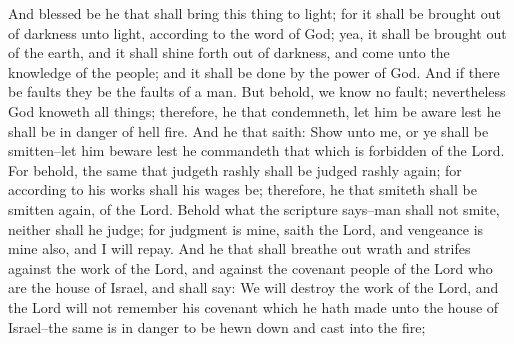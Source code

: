 And blessed be he that shall bring this thing to light; for it shall be brought out of darkness unto light, according to the word of God; yea, it shall be brought out of the earth, and it shall shine forth out of darkness, and come unto the knowledge of the people; and it shall be done by the power of God.
\bverse \iffalse And if there be faults they be the faults of a man. But behold, we know no fault; nevertheless God knoweth all things; therefore, he that condemneth, let him be aware lest he shall be in danger of hell fire. \fi
And if there be faults they be the faults of a man. But behold, we know no fault; nevertheless God knoweth all things; therefore, he that condemneth, let him be aware lest he shall be in danger of hell fire.
\bverse \iffalse And he that saith: Show unto me, or ye shall be smitten--let him beware lest he commandeth that which is forbidden of the Lord. \fi
And he that saith: Show unto me, or ye shall be smitten--let him beware lest he commandeth that which is forbidden of the Lord.
\bverse \iffalse For behold, the same that judgeth rashly shall be judged rashly again; for according to his works shall his wages be; therefore, he that smiteth shall be smitten again, of the Lord. \fi
For behold, the same that judgeth rashly shall be judged rashly again; for according to his works shall his wages be; therefore, he that smiteth shall be smitten again, of the Lord.
\bverse \iffalse Behold what the scripture says--man shall not smite, neither shall he judge; for judgment is mine, saith the Lord, and vengeance is mine also, and I will repay. \fi
Behold what the scripture says--man shall not smite, neither shall he judge; for judgment is mine, saith the Lord, and vengeance is mine also, and I will repay.
\bverse \iffalse And he that shall breathe out wrath and strifes against the work of the Lord, and against the covenant people of the Lord who are the house of Israel, and shall say: We will destroy the work of the Lord, and the Lord will not remember his covenant which he hath made unto the house of Israel--the same is in danger to be hewn down and cast into the fire; \fi
And he that shall breathe out wrath and strifes against the work of the Lord, and against the covenant people of the Lord who are the house of Israel, and shall say: We will destroy the work of the Lord, and the Lord will not remember his covenant which he hath made unto the house of Israel--the same is in danger to be hewn down and cast into the fire;
\bverse \iffalse For the eternal purposes of the Lord shall roll on, until all his promises shall be fulfilled. \fi
